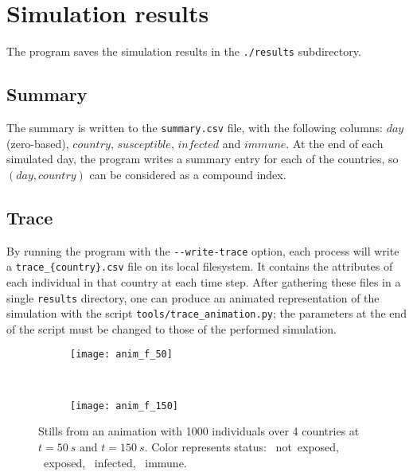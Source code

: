 \section{Simulation results}
\label{sec:sim_res}

The program saves the simulation results in the \texttt{./results} subdirectory.

\subsection{Summary}
The summary is written to the \texttt{summary.csv} file, with the following columns: $day$ (zero-based), $country$, $susceptible$, $infected$ and $immune$.
At the end of each simulated day, the program writes a summary entry for each of the countries, so $(day, country)$ can be considered as a compound index.

\subsection{Trace}
By running the program with the \verb!--write-trace! option, each process will write a \texttt{trace\_\{country\}.csv} file on its local filesystem. It contains the attributes of each individual in that country at each time step.
After gathering these files in a single \texttt{results} directory, one can produce an animated representation of the simulation with the script \texttt{tools/trace\_animation.py}; the parameters at the end of the script must be changed to those of the performed simulation.

\begin{figure}[hb]
    \begin{subfigure}[c]{0.49\textwidth}
        \texttt{[image: anim\_f\_50]}
    \end{subfigure}
    ~
    \begin{subfigure}[c]{0.49\textwidth}
        \texttt{[image: anim\_f\_150]}
    \end{subfigure}
    \caption{Stills from an animation with 1000 individuals over 4 countries at $t=\SI{50}{s}$ and $t=\SI{150}{s}$. Color represents status:
    \textcolor{plt:green}{\circmark}~not~exposed,
    \textcolor{plt:yellow}{\circmark}~exposed,
    \textcolor{plt:red}{\circmark}~infected,
    \textcolor{plt:blue}{\circmark}~immune.
    }
    \label{fig:animation}
\end{figure}